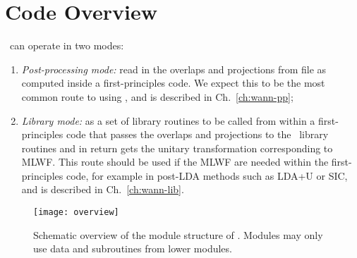 \chapter{Code Overview}
\wannier\ can operate in two modes:

\begin{enumerate}
\item {\it Post-processing mode:} read in the overlaps and projections
  from file as computed inside a first-principles code. We expect this
  to be the most common route to using \wannier, and is described in
  Ch.~\ref{ch:wann-pp};


\item {\it Library mode:} as a set of library routines to be called
  from within a first-principles code that passes the overlaps and
  projections to the \wannier\ library routines and in return gets the
  unitary transformation corresponding to MLWF. This route should be
  used if the MLWF are needed within the first-principles code, for
  example in post-LDA methods such as LDA+U or SIC, and is described
  in Ch.~\ref{ch:wann-lib}.
\end{enumerate}


\begin{figure}
\begin{center}
\texttt{[image: overview]}
\caption{Schematic overview of the module structure of
  \wannier. Modules may only use data and subroutines from lower
  modules.}
\label{structure}
\end{center}
\end{figure}

